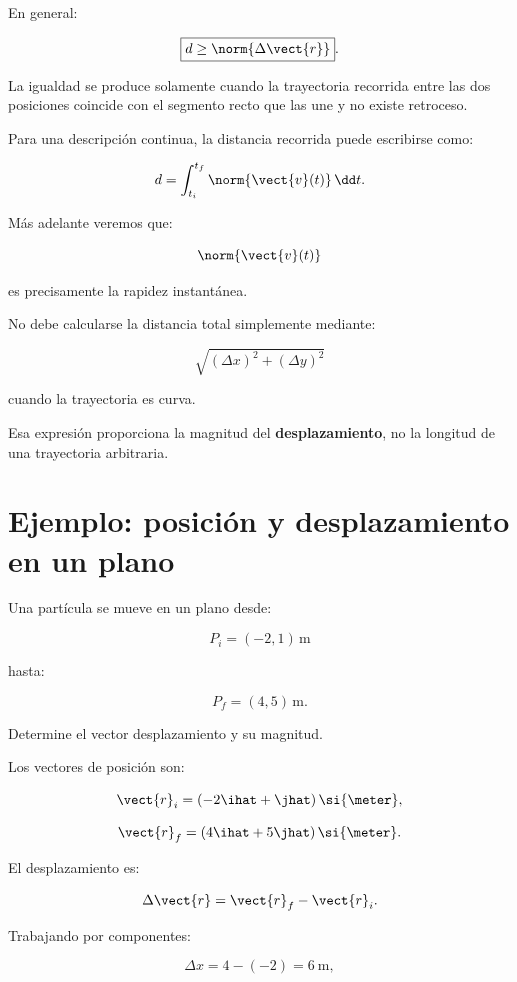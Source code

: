 En general:

\[
\boxed{
d\geq\norm{\Delta\vect{r}}
}.
\]

La igualdad se produce solamente cuando la trayectoria recorrida entre las dos
posiciones coincide con el segmento recto que las une y no existe retroceso.

Para una descripción continua, la distancia recorrida puede escribirse como:

\[
d
=
\int_{t_i}^{t_f}
\norm{\vect{v}(t)}
\,\dd t.
\]

Más adelante veremos que:

\[
\norm{\vect{v}(t)}
\]

es precisamente la rapidez instantánea.

\begin{errorfrecuente}
No debe calcularse la distancia total simplemente mediante:

\[
\sqrt{(\Delta x)^2+(\Delta y)^2}
\]

cuando la trayectoria es curva.

Esa expresión proporciona la magnitud del \textbf{desplazamiento}, no la longitud
de una trayectoria arbitraria.
\end{errorfrecuente}


\section{Ejemplo: posición y desplazamiento en un plano}

\begin{ejemplo}
Una partícula se mueve en un plano desde:

\[
P_i=(-2,1)\,\si{\meter}
\]

hasta:

\[
P_f=(4,5)\,\si{\meter}.
\]

Determine el vector desplazamiento y su magnitud.
\end{ejemplo}

Los vectores de posición son:

\[
\vect{r}_i
=
(-2\ihat+\jhat)\,\si{\meter},
\]

\[
\vect{r}_f
=
(4\ihat+5\jhat)\,\si{\meter}.
\]

El desplazamiento es:

\[
\Delta\vect{r}
=
\vect{r}_f-\vect{r}_i.
\]

Trabajando por componentes:

\[
\Delta x
=
4-(-2)
=
\SI{6}{\meter},
\]

